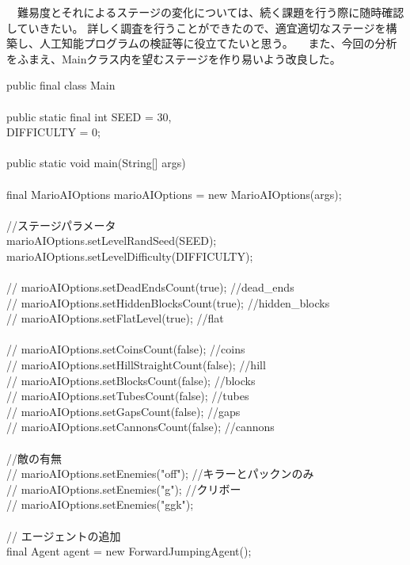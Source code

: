 \documentclass[a4j]{jarticle}
\begin{document}
\begin{description}
　難易度とそれによるステージの変化については、続く課題を行う際に随時確認していきたい。
詳しく調査を行うことができたので、適宜適切なステージを構築し、人工知能プログラムの検証等に役立てたいと思う。
　また、今回の分析をふまえ、Mainクラス内を望むステージを作り易いよう改良した。
　\begin{screen}
public final class Main\\
{\\
public static final int  SEED = 30,\\
		  	DIFFICULTY = 0;\\
\\
public static void main(String[] args)\\
{\\
    final MarioAIOptions marioAIOptions = new MarioAIOptions(args);\\
 \\
    //ステージパラメータ\\
    marioAIOptions.setLevelRandSeed(SEED);\\
    marioAIOptions.setLevelDifficulty(DIFFICULTY);\\
\\
//  marioAIOptions.setDeadEndsCount(true);		//dead\_ends\\
//  marioAIOptions.setHiddenBlocksCount(true);	//hidden\_blocks\\
//  marioAIOptions.setFlatLevel(true);			//flat\\
    \\
//  marioAIOptions.setCoinsCount(false);		//coins\\
//  marioAIOptions.setHillStraightCount(false);	//hill\\
//  marioAIOptions.setBlocksCount(false);		//blocks\\
//  marioAIOptions.setTubesCount(false);		//tubes\\
//  marioAIOptions.setGapsCount(false); 		//gaps\\
//  marioAIOptions.setCannonsCount(false);		//cannons\\
    \\
    //敵の有無\\  
//  marioAIOptions.setEnemies("off");	//キラーとパックンのみ\\
//  marioAIOptions.setEnemies("g"); 	//クリボー\\
//  marioAIOptions.setEnemies("ggk");\\
    \\
    // エージェントの追加\\
    final Agent agent = new ForwardJumpingAgent();\\
}}
\end{screen}
\end{description}
\end{document}
